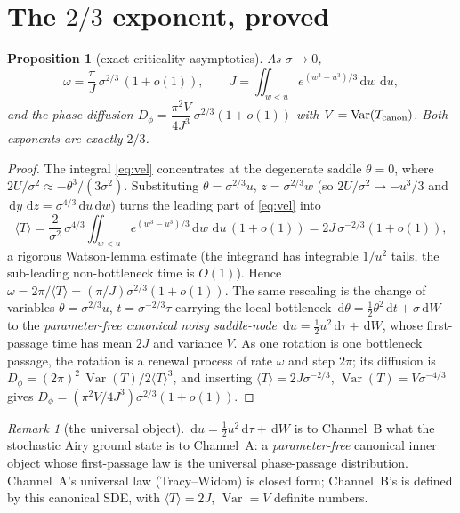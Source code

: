 \documentclass[11pt]{article}
\newtheorem{proposition}{Proposition}
\theoremstyle{remark}
\newtheorem*{remark}{Remark}
\newcommand{\dd}{\,\mathrm{d}}
\DeclareMathOperator{\Var}{Var}
\begin{document}
\section{The $2/3$ exponent, proved}

\begin{proposition}[exact criticality asymptotics]\label{prop:23}
As $\sigma\to0$,
\[
  \omega=\frac{\pi}{J}\,\sigma^{2/3}\,(1+o(1)),\qquad
  J=\iint_{w<u}e^{(w^3-u^3)/3}\dd w\,\dd u,
\]
and the phase diffusion $D_\phi=\dfrac{\pi^2 V}{4J^3}\,\sigma^{2/3}(1+o(1))$ with
$V=\Var(T_{\rm canon})$. Both exponents are exactly $2/3$.
\end{proposition}

\begin{proof}
The integral \eqref{eq:vel} concentrates at the degenerate saddle $\theta=0$, where
$2U/\sigma^2\approx-\theta^3/(3\sigma^2)$. Substituting $\theta=\sigma^{2/3}u$,
$z=\sigma^{2/3}w$ (so $2U/\sigma^2\mapsto-u^3/3$ and $\dd y\,\dd z=\sigma^{4/3}\dd u\dd w$)
turns the leading part of \eqref{eq:vel} into
\[
  \langle T\rangle=\frac{2}{\sigma^2}\,\sigma^{4/3}\!\iint_{w<u}\!e^{(w^3-u^3)/3}\dd w\,\dd u\,(1+o(1))
                 =2J\,\sigma^{-2/3}(1+o(1)),
\]
a rigorous Watson-lemma estimate (the integrand has integrable $1/u^2$ tails, the
sub-leading non-bottleneck time is $O(1)$). Hence $\omega=2\pi/\langle T\rangle=
(\pi/J)\sigma^{2/3}(1+o(1))$. The same rescaling is the change of variables
$\theta=\sigma^{2/3}u$, $t=\sigma^{-2/3}\tau$ carrying the local bottleneck
$\dd\theta=\tfrac12\theta^2\dd t+\sigma\dd W$ to the \emph{parameter-free canonical noisy
saddle-node} $\dd u=\tfrac12 u^2\dd\tau+\dd W$, whose first-passage time has mean $2J$ and
variance $V$. As one rotation is one bottleneck passage, the rotation is a renewal process
of rate $\omega$ and step $2\pi$; its diffusion is
$D_\phi=(2\pi)^2\,\Var(T)/2\langle T\rangle^3$, and inserting
$\langle T\rangle=2J\sigma^{-2/3}$, $\Var(T)=V\sigma^{-4/3}$ gives
$D_\phi=(\pi^2 V/4J^3)\sigma^{2/3}(1+o(1))$.
\end{proof}

\begin{remark}[the universal object]
$\dd u=\tfrac12 u^2\dd\tau+\dd W$ is to Channel~B what the stochastic Airy ground state is
to Channel~A: a \emph{parameter-free} canonical inner object whose first-passage law is the
universal phase-passage distribution. Channel~A's universal law (Tracy--Widom) is closed
form; Channel~B's is defined by this canonical SDE, with $\langle T\rangle=2J$,
$\Var=V$ definite numbers.
\end{remark}
\end{document}
